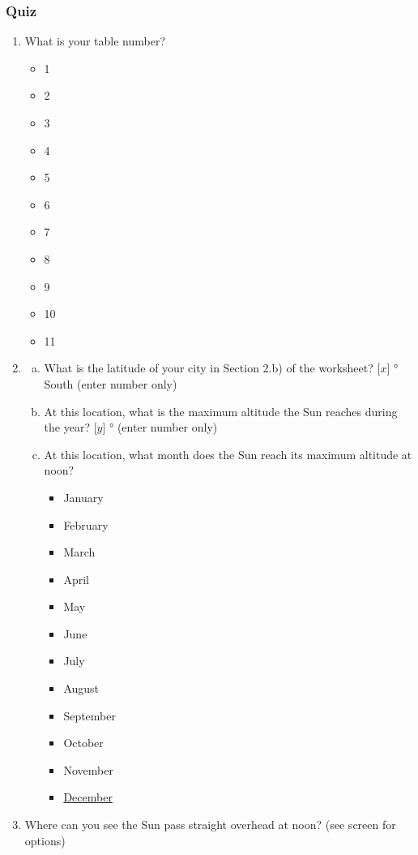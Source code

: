 \documentclass[12pt]{article}
\begin{document}
\subsubsection{Quiz}
\begin{enumerate}
\item
What is your table number?
\begin{itemize}
    \item 1
    \item 2
    \item 3
    \item 4
    \item 5
    \item 6
    \item 7
    \item 8
    \item 9
    \item 10
    \item 11
\end{itemize}
\item
\begin{enumerate}[a.]
    \item
    What is the latitude of your city in Section 2.b) of the worksheet? [$x$] \si{\degree} South (enter number only)
    \item
    At this location, what is the maximum altitude the Sun reaches during the year? [$y$] \si{\degree} (enter number only)
    \item
    At this location, what month does the Sun reach its maximum altitude at noon?
    \begin{itemize}
        \item January
        \item February
        \item March
        \item April
        \item May
        \item June
        \item July
        \item August
        \item September
        \item October
        \item November
        \item \underline{December}
    \end{itemize}
\end{enumerate}
\item
Where can you see the Sun pass straight overhead at noon? (see screen for options)

\end{enumerate}
\end{document}
